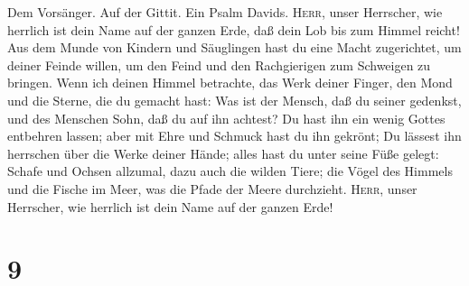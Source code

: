  Dem Vorsänger. Auf der Gittit. Ein Psalm Davids.
\textsc{Herr}, unser Herrscher, wie herrlich ist dein Name auf der
ganzen Erde, daß dein Lob bis zum Himmel reicht!  Aus dem
Munde von Kindern und Säuglingen hast du eine Macht zugerichtet, um
deiner Feinde willen, um den Feind und den Rachgierigen zum Schweigen zu
bringen.  Wenn ich deinen Himmel betrachte, das Werk
deiner Finger, den Mond und die Sterne, die du gemacht hast:
 Was ist der Mensch, daß du seiner gedenkst, und des
Menschen Sohn, daß du auf ihn achtest?  Du hast ihn ein
wenig Gottes entbehren lassen; aber mit Ehre und Schmuck hast du ihn
gekrönt;  Du lässest ihn herrschen über die Werke deiner
Hände; alles hast du unter seine Füße gelegt:  Schafe und
Ochsen allzumal, dazu auch die wilden Tiere;  die Vögel
des Himmels und die Fische im Meer, was die Pfade der Meere durchzieht.
 \textsc{Herr}, unser Herrscher, wie herrlich ist dein
Name auf der ganzen Erde!

\hypertarget{section-8}{%
\section{9}\label{section-8}}

